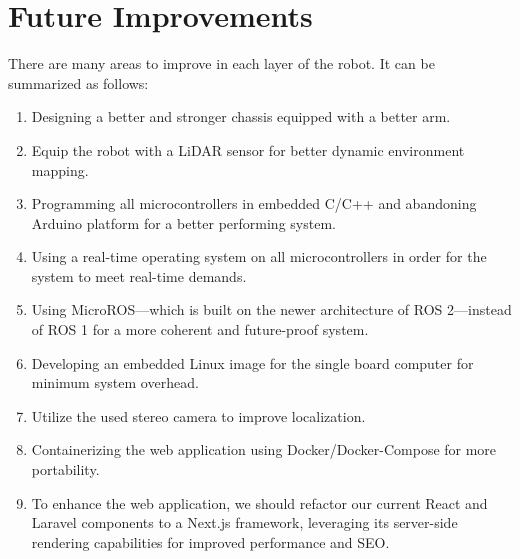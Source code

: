 \section{Future Improvements}
There are many areas to improve in each layer of the robot. It can be summarized as follows:
\begin{enumerate}
	\item Designing a better and stronger chassis equipped with a better arm.
	\item Equip the robot with a LiDAR sensor for better dynamic environment mapping.
    \item Programming all microcontrollers in embedded C/C++ and abandoning Arduino platform for a better performing system.
    \item Using a real-time operating system on all microcontrollers in order for the system to meet real-time demands.
    \item Using MicroROS---which is built on the newer architecture of ROS 2---instead of ROS 1 for a more coherent and future-proof system.
    \item Developing an embedded Linux image for the single board computer for minimum system overhead.
    \item Utilize the used stereo camera to improve localization.
    \item Containerizing the web application using Docker/Docker-Compose for more portability.
    \item To enhance the web application, we should refactor our current React and Laravel components to a Next.js framework, leveraging its server-side rendering capabilities for improved performance and SEO.
\end{enumerate}
